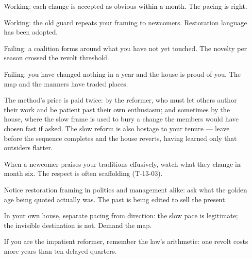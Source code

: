 \begin{feedback}
  \item Working: each change is accepted as obvious within a month. The pacing is right.
  \item Working: the old guard repeats your framing to newcomers. Restoration language has been adopted.
  \item Failing: a coalition forms around what you have not yet touched. The novelty per season crossed the revolt threshold.
  \item Failing: you have changed nothing in a year and the house is proud of you. The map and the manners have traded places.
\end{feedback}
\begin{failure}
The method's price is paid twice: by the reformer, who must let others author their work and be patient past their own enthusiasm; and sometimes by the house, where the slow frame is used to bury a change the members would have chosen fast if asked. The slow reform is also hostage to your tenure --- leave before the sequence completes and the house reverts, having learned only that outsiders flatter.
\end{failure}
\begin{countermeasures}
  \item When a newcomer praises your traditions effusively, watch what they change in month six. The respect is often scaffolding (T-13-03).
  \item Notice restoration framing in politics and management alike: ask what the golden age being quoted actually was. The past is being edited to sell the present.
  \item In your own house, separate pacing from direction: the slow pace is legitimate; the invisible destination is not. Demand the map.
  \item If you are the impatient reformer, remember the law's arithmetic: one revolt costs more years than ten delayed quarters.
\end{countermeasures}

\seesources
{}
